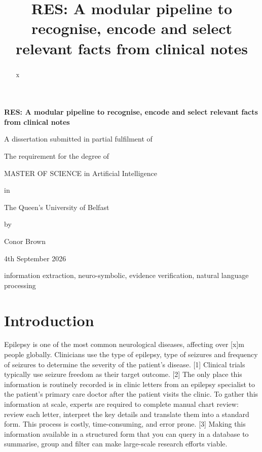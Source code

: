 \documentclass[conference]{IEEEtran}
\begin{document}
\begin{titlepage}
    \centering

    {\Huge\bfseries RES: A modular pipeline to recognise, encode and select relevant facts from clinical notes\par}
    \vspace{2cm}

    {\large
    A dissertation submitted in partial fulfilment of\par
    The requirement for the degree of\par
    MASTER OF SCIENCE in Artificial Intelligence\par
    in\par
    The Queen’s University of Belfast\par
    by\par
    Conor Brown\par
    4th September 2026
    }
\end{titlepage}


\title{RES: A modular pipeline to recognise, encode and select relevant facts from clinical notes\\}



\maketitle

\begin{abstract}
x
\end{abstract}

\begin{IEEEkeywords}
information extraction, neuro-symbolic, evidence verification, 
natural language processing
\end{IEEEkeywords}

\section{Introduction}

Epilepsy is one of the most common neurological 
diseases, affecting over [x]m people globally. Clinicians use 
the type of epilepsy, type of seizures and frequency of 
seizures to determine the severity of the patient's disease. [1]
Clinical trials typically use seizure freedom as their target 
outcome. [2] The only place this information is routinely 
recorded is in clinic letters from an epilepsy specialist to 
the patient's primary care doctor after the patient visits the 
clinic. To gather this information at scale, experts are 
required to complete manual chart review: review each 
letter, interpret the key details and translate them into a 
standard form. This process is costly, time-consuming, 
and error prone. [3] Making this information available in a 
structured form that you can query in a database to 
summarise, group and filter can make large-scale
research efforts viable.
\end{document}
